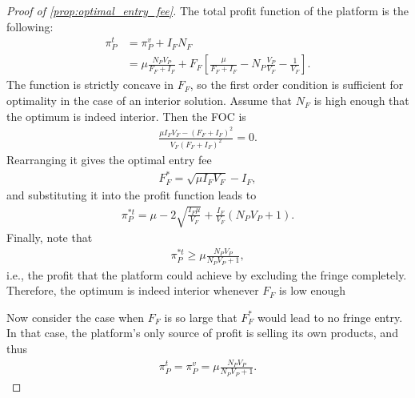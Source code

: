 \documentclass[a4paper]{article}
\begin{document}
\begin{proof}[Proof of \cref{prop:optimal_entry_fee}]
    The total profit function of the platform is the following:
    \begin{align*}
        \pi_P^t &= \pi_P^v + I_F N_F \\
        &= \mu \frac{N_P V_P}{F_F + I_F} + F_F \left[ \frac{\mu}{F_F + I_F} - N_P \frac{V_P}{V_F} - \frac{1}{V_F} \right].
    \end{align*}
    The function is strictly concave in $F_F$, so the first order condition is sufficient for optimality in the case of an interior solution.
    Assume that $N_F$ is high enough that the optimum is indeed interior.
    Then the FOC is
    \begin{align*}
        \frac{\mu I_F V_F - (F_F + I_F)^2}{V_F (F_F + I_F)^2} = 0.
    \end{align*}
    Rearranging it gives the optimal entry fee
    \begin{align*}
        F_F^* = \sqrt{\mu I_F V_F} - I_F,
    \end{align*}
    and substituting it into the profit function leads to
    \begin{align*}
        \pi_P^{*t} = \mu - 2\sqrt{\frac{I_F \mu}{V_F}} + \frac{I_F}{V_F} (N_P V_P + 1).
    \end{align*}
    Finally, note that
    \begin{align*}
        \pi_P^{*t} \geq \mu \frac{N_P V_P}{N_P V_P + 1},
    \end{align*}
    i.e., the profit that the platform could achieve by excluding the fringe completely.
    Therefore, the optimum is indeed interior whenever $F_F$ is low enough

    Now consider the case when $F_F$ is so large that $F_F^*$ would lead to no fringe entry.
    In that case, the platform's only source of profit is selling its own products, and thus
    \begin{align*}
        \pi_P^{t} = \pi_P^{v} = \mu \frac{ N_P V_P}{N_P V_P + 1}.
    \end{align*}
\end{proof}
\end{document}
